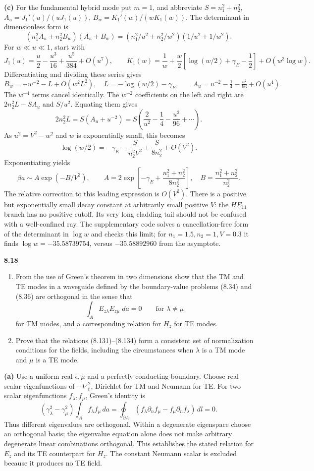 \medskip\noindent\textbf{(c)} For the fundamental hybrid mode put $m=1$, and abbreviate
$S=n_1^2+n_2^2$,
$A_u=J_1'(u)/(uJ_1(u))$, $B_w=K_1'(w)/(wK_1(w))$.
The determinant in dimensionless form is
\[
(n_1^2A_u+n_2^2B_w)(A_u+B_w)
=(n_1^2/u^2+n_2^2/w^2)(1/u^2+1/w^2).
\]
For $w\ll u\ll1$, start with
\[
J_1(u)=\frac u2-\frac{u^3}{16}+\frac{u^5}{384}+O(u^7),
\qquad
K_1(w)=\frac1w+\frac w2
 \left[\log(w/2)+\gamma_E-\frac12\right]+O(w^3\log w).
\]
Differentiating and dividing these series gives
\[
B_w=-w^{-2}-L+O(w^2L^2),\quad L=-\log(w/2)-\gamma_E,
\qquad A_u=u^{-2}-\tfrac14-\tfrac{u^2}{96}+O(u^4).
\]
The $w^{-4}$ terms cancel identically. The $w^{-2}$ coefficients
on the left and right are $2n_2^2L-SA_u$ and $S/u^2$.
Equating them gives
\[
2n_2^2L=S(A_u+u^{-2})
=S\left(\frac2{u^2}-\frac14-\frac{u^2}{96}+\cdots\right).
\]
As $u^2=V^2-w^2$ and $w$ is exponentially small, this becomes
\[
\log(w/2)=-\gamma_E-\frac{S}{n_2^2V^2}
 +\frac{S}{8n_2^2}+O(V^2).
\]
Exponentiating yields
\[
\boxed{\beta a\sim A\exp(-B/V^2),\qquad
 A=2\exp\!\left[-\gamma_E+\frac{n_1^2+n_2^2}{8n_2^2}\right],
 \quad B=\frac{n_1^2+n_2^2}{n_2^2}.}
\]
The relative correction to this leading expression is $O(V^2)$.
There is a positive but exponentially small decay constant at
arbitrarily small positive $V$: the $HE_{11}$ branch has no
positive cutoff.  Its very long cladding tail should not be confused
with a well-confined ray.  The supplementary code solves a
cancellation-free form of the determinant in $\log w$ and checks
this limit; for $n_1=1.5,n_2=1,V=0.3$ it finds
$\log w=-35.58739754$, versus $-35.58892960$ from the asymptote.

\par\bigskip
\noindent\textbf{8.18}\quad\begin{enumerate}
\item[(a)] From the use of Green's theorem in two dimensions show that the TM and TE modes in a waveguide defined by the boundary-value problems (8.34) and (8.36) are orthogonal in the sense that
\[
\int_{A}E_{z\lambda}E_{z\mu}\;da=0\qquad\text{for }\lambda\neq\mu
\]
for TM modes, and a corresponding relation for $H_{z}$ for TE modes.
\item[(b)] Prove that the relations (8.131)--(8.134) form a consistent set of normalization conditions for the fields, including the circumstances when $\lambda$ is a TM mode and $\mu$ is a TE mode.
\end{enumerate}
\solution

\medskip\noindent\textbf{(a)} Use a uniform real $\epsilon,\mu$ and a perfectly conducting
boundary.  Choose real scalar eigenfunctions of
$-\nabla_t^2$, Dirichlet for TM and Neumann for TE.
For two scalar eigenfunctions $f_\lambda,f_\mu$, Green's identity
is
\[
(\gamma_\lambda^2-\gamma_\mu^2)
 \int_A f_\lambda f_\mu\,da
=\oint_{\partial A}
 (f_\lambda\partial_nf_\mu-f_\mu\partial_nf_\lambda)\,dl=0.
\]
Thus different eigenvalues are orthogonal.  Within a degenerate
eigenspace choose an orthogonal basis; the eigenvalue equation
alone does not make arbitrary degenerate linear combinations
orthogonal.  This establishes the stated relation for $E_z$ and
its TE counterpart for $H_z$.  The constant Neumann scalar is
excluded because it produces no TE field.


